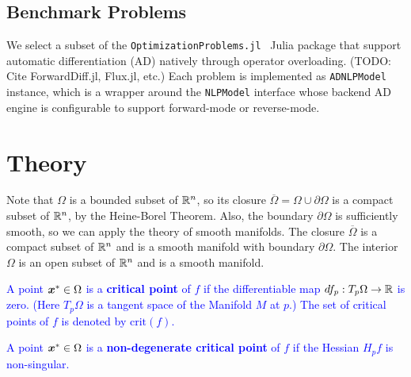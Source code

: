 \documentclass[10pt]{article}
\begin{document}
        \medskip
    

    \subsection{Benchmark Problems}
        \label{intro:problems}
        We select a subset of the \texttt{OptimizationProblems.jl}~\cite{OptimizationProblems}
        Julia package that support automatic differentiation (AD) natively through operator
        overloading. (TODO: Cite ForwardDiff.jl, Flux.jl, etc.) Each problem is implemented
        as \texttt{ADNLPModel} instance, which is a wrapper around the \texttt{NLPModel} interface
        whose backend AD engine is configurable to support forward-mode or reverse-mode.



    

    
\section{Theory}
    Note that $\Omega$ is a bounded subset of $\mathbb{R}^n$, so its closure
    $\overline{\Omega} = \Omega \cup \partial \Omega$ is a compact subset
    of $\mathbb{R}^n$, by the Heine-Borel Theorem.
    Also, the boundary $\partial \Omega$ is sufficiently smooth,
    so we can apply the theory of smooth manifolds.
    The closure $\overline{\Omega}$ is a compact subset of $\mathbb{R}^n$ and
    is a smooth manifold with boundary $\partial \Omega$.
    The interior $\Omega$ is an open subset of $\mathbb{R}^n$ and is a smooth manifold.


\begin{definition}
    \textcolor{blue}{
        A point $\bm{x}^* \in \Omega$ is a \textbf{critical point} of $f$ if the
        differentiable map $df_p: T_p \Omega \rightarrow \mathbb{R}$ is zero. (Here
        $T_p \Omega$ is a tangent space of the Manifold $M$ at $p$.) 
        The set of critical points of $f$ is denoted by $\text{crit}(f)$.
    }
\end{definition}

\begin{definition}
    \textcolor{blue}{
        A point $\bm{x}^* \in \Omega$ is a \textbf{non-degenerate critical point} of $f$ if
        the Hessian $H_p f$ is non-singular.
    }
\end{definition}
\end{document}
